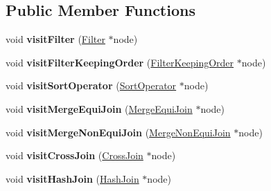 \subsection*{Public Member Functions}
\begin{DoxyCompactItemize}
\item 
\hypertarget{class_sort_resolving_physical_operator_visitor_a3926398064f1ba2e83f51655602b2728}{void {\bfseries visit\+Filter} (\hyperlink{class_filter}{Filter} $\ast$node)}\label{class_sort_resolving_physical_operator_visitor_a3926398064f1ba2e83f51655602b2728}

\item 
\hypertarget{class_sort_resolving_physical_operator_visitor_af325e3dd58483252d54f4b5d38e917b9}{void {\bfseries visit\+Filter\+Keeping\+Order} (\hyperlink{class_filter_keeping_order}{Filter\+Keeping\+Order} $\ast$node)}\label{class_sort_resolving_physical_operator_visitor_af325e3dd58483252d54f4b5d38e917b9}

\item 
\hypertarget{class_sort_resolving_physical_operator_visitor_a50769d4f004016b66506b7c90285f79e}{void {\bfseries visit\+Sort\+Operator} (\hyperlink{class_sort_operator}{Sort\+Operator} $\ast$node)}\label{class_sort_resolving_physical_operator_visitor_a50769d4f004016b66506b7c90285f79e}

\item 
\hypertarget{class_sort_resolving_physical_operator_visitor_ab21600126e2afdedd27f31e3ef2297a3}{void {\bfseries visit\+Merge\+Equi\+Join} (\hyperlink{class_merge_equi_join}{Merge\+Equi\+Join} $\ast$node)}\label{class_sort_resolving_physical_operator_visitor_ab21600126e2afdedd27f31e3ef2297a3}

\item 
\hypertarget{class_sort_resolving_physical_operator_visitor_afe0fade01bbfc9a1b04bb885ca03f4bd}{void {\bfseries visit\+Merge\+Non\+Equi\+Join} (\hyperlink{class_merge_non_equi_join}{Merge\+Non\+Equi\+Join} $\ast$node)}\label{class_sort_resolving_physical_operator_visitor_afe0fade01bbfc9a1b04bb885ca03f4bd}

\item 
\hypertarget{class_sort_resolving_physical_operator_visitor_aabe88bc98a99601d248f534bd99a9324}{void {\bfseries visit\+Cross\+Join} (\hyperlink{class_cross_join}{Cross\+Join} $\ast$node)}\label{class_sort_resolving_physical_operator_visitor_aabe88bc98a99601d248f534bd99a9324}

\item 
\hypertarget{class_sort_resolving_physical_operator_visitor_a73404d0c191c143eb206502d06d8e033}{void {\bfseries visit\+Hash\+Join} (\hyperlink{class_hash_join}{Hash\+Join} $\ast$node)}\label{class_sort_resolving_physical_operator_visitor_a73404d0c191c143eb206502d06d8e033}


\end{DoxyCompactItemize}
